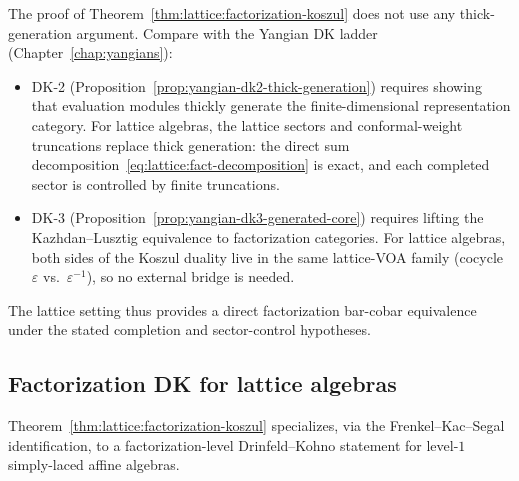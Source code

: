 \begin{remark}
\label{rem:lattice:no-thick-generation}
The proof of
Theorem~\ref{thm:lattice:factorization-koszul} does not use any
thick-generation argument. Compare with the Yangian DK ladder
(Chapter~\ref{chap:yangians}):
\begin{itemize}
\item DK-2 (Proposition~\ref{prop:yangian-dk2-thick-generation})
 requires showing that evaluation modules thickly generate the
 finite-dimensional representation category. For lattice algebras,
 the lattice sectors and conformal-weight truncations replace thick
 generation: the direct sum decomposition~\eqref{eq:lattice:fact-decomposition}
 is exact, and each completed sector is controlled by finite
 truncations.
\item DK-3 (Proposition~\ref{prop:yangian-dk3-generated-core})
 requires lifting the Kazhdan--Lusztig equivalence to factorization
 categories. For lattice algebras, both sides of the Koszul duality
 live in the same lattice-VOA family (cocycle
 $\varepsilon$ vs.\ $\varepsilon^{-1}$), so no external bridge
 is needed.
\end{itemize}
The lattice setting thus provides a direct factorization bar-cobar
equivalence under the stated completion and sector-control hypotheses.
\end{remark}


\subsection{Factorization DK for lattice algebras}

Theorem~\ref{thm:lattice:factorization-koszul} specializes, via the
Frenkel--Kac--Segal identification, to a factorization-level
Drinfeld--Kohno statement for level-$1$ simply-laced affine algebras.

